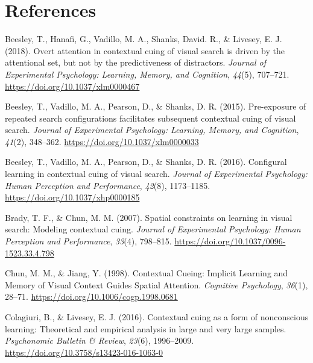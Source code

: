 \documentclass[
  man,floatsintext]{apa7}
\newlength{\cslhangindent}
\newlength{\cslentryspacingunit} %
\newenvironment{CSLReferences}[2] %
 {%
  \setlength{\parindent}{0pt}
  \ifodd #1
  \let\oldpar\par
  \def\par{\hangindent=\cslhangindent\oldpar}
  \fi
  \setlength{\parskip}{#2\cslentryspacingunit}
 }%
 {}
\begin{document}
\hypertarget{references}{%
\section*{References}\label{references}}

\hypertarget{refs}{}
\begin{CSLReferences}{1}{0}
\leavevmode{}%
Beesley, T., Hanafi, G., Vadillo, M. A., Shanks, David. R., \& Livesey, E. J. (2018). Overt attention in contextual cuing of visual search is driven by the attentional set, but not by the predictiveness of distractors. \emph{Journal of Experimental Psychology: Learning, Memory, and Cognition}, \emph{44}(5), 707--721. \url{https://doi.org/10.1037/xlm0000467}

\leavevmode{}%
Beesley, T., Vadillo, M. A., Pearson, D., \& Shanks, D. R. (2015). Pre-exposure of repeated search configurations facilitates subsequent contextual cuing of visual search. \emph{Journal of Experimental Psychology: Learning, Memory, and Cognition}, \emph{41}(2), 348--362. \url{https://doi.org/10.1037/xlm0000033}

\leavevmode{}%
Beesley, T., Vadillo, M. A., Pearson, D., \& Shanks, D. R. (2016). Configural learning in contextual cuing of visual search. \emph{Journal of Experimental Psychology: Human Perception and Performance}, \emph{42}(8), 1173--1185. \url{https://doi.org/10.1037/xhp0000185}

\leavevmode{}%
Brady, T. F., \& Chun, M. M. (2007). Spatial constraints on learning in visual search: {Modeling} contextual cuing. \emph{Journal of Experimental Psychology: Human Perception and Performance}, \emph{33}(4), 798--815. \url{https://doi.org/10.1037/0096-1523.33.4.798}

\leavevmode{}%
Chun, M. M., \& Jiang, Y. (1998). Contextual {Cueing}: {Implicit Learning} and {Memory} of {Visual Context Guides Spatial Attention}. \emph{Cognitive Psychology}, \emph{36}(1), 28--71. \url{https://doi.org/10.1006/cogp.1998.0681}

\leavevmode{}%
Colagiuri, B., \& Livesey, E. J. (2016). Contextual cuing as a form of nonconscious learning: {Theoretical} and empirical analysis in large and very large samples. \emph{Psychonomic Bulletin \& Review}, \emph{23}(6), 1996--2009. \url{https://doi.org/10.3758/s13423-016-1063-0}


\end{CSLReferences}
\end{document}
